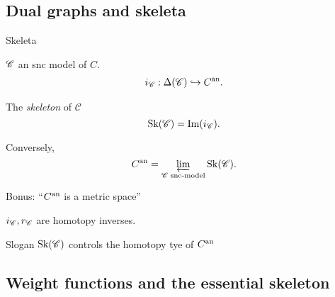 \subsection{Dual graphs and skeleta} \label{sec:dual_graphs_and_skeleta}
\begin{frame}{Skeleta}
	\begin{minipage}{.49\textwidth}
	 $\mathscr C$ an snc model of  $C$. 
	 \begin{align*}
		 i_{\mathscr C}: \Delta(\mathscr C) \hookrightarrow C{}^{\text{an}}
	 .\end{align*}
	\end{minipage}\;\;
	\begin{minipage}{.48\textwidth}
	 \begin{definition}
		 The \emph{skeleton} of $\mathscr C$
	 	\[
			\operatorname{Sk}(\mathscr C) = \operatorname{Im} (i_{\mathscr C})
	 	.\] 
	 \end{definition}
	\end{minipage}

	\bigskip
	\pause

	 Conversely, \[
		 C{}^{\text{an}} = \varprojlim_{\mathscr C \text{ snc-model}} \operatorname{Sk}(\mathscr C)
	 .\] 

	 \medskip 
	 Bonus: ``$C{}^{\text{an}}$ is a metric space''
\end{frame}


\begin{frame}
\begin{figure}[ht]
    \centering
\end{figure}
\pause
$i_{\mathscr C}, r_{\mathscr C}$ are homotopy inverses.
\begin{block}{Slogan}
	$\operatorname{Sk}(\mathscr C)$ controls the homotopy tye of $C{}^{\text{an}}$
\end{block}
\end{frame}
\subsection{Weight functions and the essential skeleton} \label{sec:weight_functions_and_essential_skeleta}

